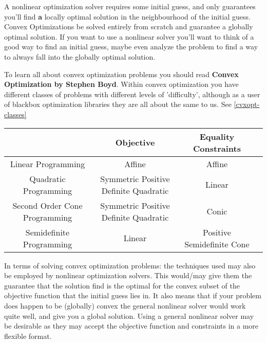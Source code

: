 \documentclass[a4paper, 10pt, twocolumn]{article}
\begin{document}
A nonlinear optimization solver requires some initial guess, and only guarantees you'll find \textbf{a} locally optimal solution in the neighbourhood of the initial guess. Convex Optimizations be solved entirely from scratch and guarantee a globally optimal solution. If you want to use a nonlinear solver you'll want to think of a good way to find an initial guess, maybe even analyze the problem to find a way to always fall into the globally optimal solution.

To learn all about convex optimization problems you should read \textbf{Convex Optimization by Stephen Boyd}.
Within convex optimization you have different classes of problems with different levels of 'difficulty', although as a user of blackbox optimization libraries they are all about the same to us. See \ref{cvxopt-classes}

\begin{figure*}[htb]
    \centering
    \begin{tabular}[htb]{|c|c|c|c|}
        \hline
                                      & Objective                             & Equality Constraints       \\
        \hline
        Linear Programming            & Affine                                & Affine                     \\
        Quadratic Programming         & Symmetric Positive Definite Quadratic & Linear                     \\
        Second Order Cone Programming & Symmetric Positive Definite Quadratic & Conic                      \\
        Semidefinite Programming      & Linear                                & Positive Semidefinite Cone \\\hline
    \end{tabular}
    \caption{Kinds of Convex Optimization problems}
    \label{cvxopt-classes}
\end{figure*}

In terms of solving convex optimization problems: the techniques used may also be employed by nonlinear optimization solvers. This would/may give them the guarantee that the solution find is the optimal for the convex subset of the objective function that the initial guess lies in. It also means that if your problem does happen to be (globally) convex the general nonlinear solver would work quite well, and give you a global solution. Using a general nonlinear solver may be desirable as they may accept the objective function and constraints in a more flexible format.
\end{document}
